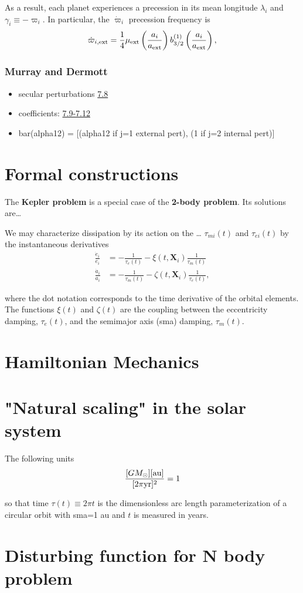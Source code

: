 \documentclass[11pt]{article}
\begin{document}
As a result, each planet experiences a precession in its mean longitude \(\lambda_i\) and
\(\gamma_i\equiv -\varpi_i\). In particular, the \(\dot\varpi_i\) precession frequency
is
\begin{equation}
\dot\varpi_{i, \rm ext} = \frac14 \mu_{\rm ext} 
    \left(\frac{a_i}{a_{\rm ext}}\right) b_{3/2}^{(1)}\left(\frac{a_i}{a_{\rm ext}}\right),
\end{equation}

\subsubsection{Murray and Dermott}
\label{sec:orgaab13a3}
\begin{itemize}
\item secular perturbations \href{./images/screenshot-02.png}{7.8}
\item coefficients: \href{./images/screenshot-03.png}{7.9-7.12}
\item bar(alpha12) = [(alpha12 if j=1 external pert),  (1 if j=2 internal pert)]
\end{itemize}

\section{Formal constructions}
\label{sec:org9dcab85}
The \textbf{Kepler problem} is a special case of the \textbf{2-body problem}.
Its solutions are\ldots{}

We may characterize dissipation by its action on the \ldots{}
\(\tau_{mi}(t)\) and \(\tau_{ei}(t)\) by the instantaneous derivatives
\begin{align}
   \frac{\dot e_i}{e_i} &= - \frac{1}{\tau_e(t)} - \xi(t, \mathbf X_i)\frac{1}{\tau_m(t)} \\
   \frac{\dot a_i}{a_i} &= -\frac{1}{\tau_m(t)} - \zeta(t, \mathbf X_i)\frac{1}{\tau_e(t)},
\end{align}
\noindent

\noindent
where the dot notation corresponds to the time derivative of the
orbital elements. The functions \(\xi(t)\) and \(\zeta(t)\) are the
coupling between the eccentricity damping, \(\tau_e(t)\), and the
semimajor axis (sma) damping, \(\tau_m(t)\).

\section{Hamiltonian Mechanics}
\label{sec:org76a854f}
\section{"Natural scaling" in the solar system}
\label{sec:orge4536c5}
The following units
\begin{align}
\frac{[GM_\odot][{\rm au}]}{[2\pi{\rm yr}]^2} = 1
\end{align}

\noindent so that time \(\tau(t) \equiv 2\pi t\) is the
dimensionless arc length parameterization of a circular orbit
with sma=1 au and \(t\) is measured in years.
\section{Disturbing function for N body problem}
\label{sec:org4cb5210}
\end{document}
